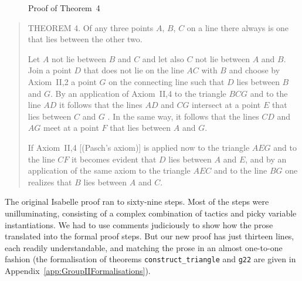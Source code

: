 \begin{figure}
    
\caption{Proof of Theorem~4}
\end{figure}

\begin{quote}
THEOREM 4. Of any three points $A$, $B$, $C$ on a line there always is one that lies between the other two.

Let $A$ not lie between $B$ and $C$ and let also $C$ not lie between $A$ and $B$. Join a point $D$ that does not lie on the line $AC$ with $B$ and choose by Axiom~II,2 a point $G$ on the connecting line such that $D$ lies between $B$ and $G$. By an application of Axiom~II,4 to the triangle $BCG$ and to the line $AD$ it follows that the lines $AD$ and $CG$ intersect at a point $E$ that lies between $C$ and $G$ . In the same way, it follows that the lines $CD$ and $AG$ meet at a point $F$ that lies between $A$ and $G$.

If Axiom~II,4 [(Pasch's axiom)] is applied now to the triangle $AEG$ and to the line $CF$ it becomes evident that $D$ lies between $A$ and $E$, and by an application of the same axiom to the triangle $AEC$ and to the line $BG$ one realizes that $B$ lies between $A$ and $C$.
\end{quote}

The original Isabelle proof ran to sixty-nine steps. Most of the steps were unilluminating, consisting of a complex combination of tactics and picky variable instantiations. We had to use comments judiciously to show how the prose translated into the formal proof steps. But our new proof has just thirteen lines, each readily understandable, and matching the prose in an almost one-to-one fashion (the formalisation of theorems \texttt{construct\_triangle} and \texttt{g22} are given in Appendix~\ref{app:GroupIIFormalisations}).

